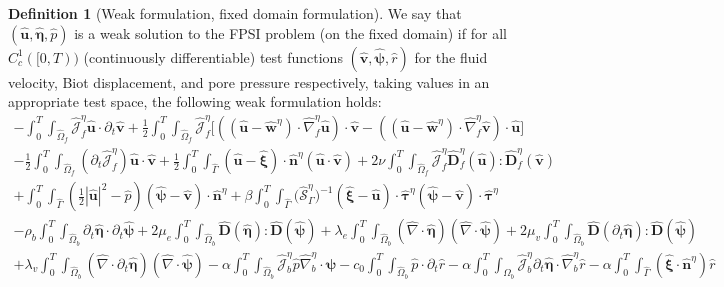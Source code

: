 \documentclass[11pt]{article}
\newcommand{\bd}{\boldsymbol}
\theoremstyle{definition}
\newtheorem{definition}{Definition}[section]
\begin{document}
\begin{definition}[Weak formulation, fixed domain formulation]\label{woregularitydef}
We say that $(\hat{\bd{u}}, \hat{\bd{\eta}}, \hat{p})$ is a weak solution to the FPSI problem (on the fixed domain) if for all $C_{c}^{1}([0, T))$ (continuously differentiable) test functions $(\hat{\bd{v}}, \hat{\bd{\psi}}, \hat{r})$ for the fluid velocity, Biot displacement, and pore pressure respectively, taking values in an appropriate test space, the following weak formulation holds:
\begin{multline*}
-\int_{0}^{T} \int_{\hat{\Omega}_{f}} \hat{\mathcal{J}}^{\eta}_{f} \hat{\bd{u}} \cdot \partial_{t} \hat{\bd{v}} + \frac{1}{2} \int_{0}^{T} \int_{\hat{\Omega}_{f}} \hat{\mathcal{J}}^{\eta}_{f} \Big[((\hat{\bd{u}} - \hat{\bd{w}}^{\eta}) \cdot \hat{\nabla}^{\eta}_{f} \hat{\bd{u}}) \cdot \hat{\bd{v}} - ((\hat{\bd{u}} - \hat{\bd{w}}^{\eta}) \cdot \hat{\nabla}^{\eta}_{f} \hat{\bd{v}}) \cdot \hat{\bd{u}}\Big] \\
- \frac{1}{2} \int_{0}^{T} \int_{\hat{\Omega}_{f}} (\partial_{t}\hat{\mathcal{J}}^{\eta}_{f}) \hat{\bd{u}} \cdot \hat{\bd{v}} + \frac{1}{2} \int_{0}^{T} \int_{\hat{\Gamma}} (\hat{\bd{u}} - \hat{\bd{\xi}}) \cdot \hat{\bd{n}}^{\eta} (\hat{\bd{u}} \cdot \hat{\bd{v}}) + 2\nu \int_{0}^{T} \int_{\hat{\Omega}_{f}} \hat{\mathcal{J}}^{\eta}_{f} \hat{\bd{D}}^{\eta}_{f}(\hat{\bd{u}}) : \hat{\bd{D}}^{\eta}_{f}(\hat{\bd{v}}) \\
+ \int_{0}^{T} \int_{\hat{\Gamma}} \left(\frac{1}{2} |\hat{\bd{u}}|^{2} - \hat{p}\right) (\hat{\bd{\psi}} - \hat{\bd{v}}) \cdot \hat{\bd{n}}^{\eta} + \beta \int_{0}^{T} \int_{\hat{\Gamma}} \Big(\hat{\mathcal{S}}^{\eta}_{\Gamma}\Big)^{-1} (\hat{\bd{\xi}} - \hat{\bd{u}}) \cdot \hat{\bd{\tau}}^{\eta} (\hat{\bd{\psi}} - \hat{\bd{v}}) \cdot \hat{\bd{\tau}}^{\eta} \\
- \rho_{b} \int_{0}^{T} \int_{\hat{\Omega}_{b}} \partial_{t} \hat{\bd{\eta}} \cdot \partial_{t} \hat{\bd{\psi}} + 2\mu_{e} \int_{0}^{T} \int_{\hat{\Omega}_{b}} \hat{\bd{D}}(\hat{\bd{\eta}}) : \hat{\bd{D}}(\hat{\bd{\psi}}) + \lambda_{e} \int_{0}^{T} \int_{\hat{\Omega}_{b}} (\hat{\nabla} \cdot \hat{\bd{\eta}}) (\hat{\nabla} \cdot \hat{\bd{\psi}}) + 2\mu_{v} \int_{0}^{T} \int_{\hat{\Omega}_{b}} \hat{\bd{D}}(\partial_{t}\hat{\bd{\eta}}) : \hat{\bd{D}}(\hat{\bd{\psi}}) \\
+ \lambda_{v} \int_{0}^{T} \int_{\hat{\Omega}_{b}} (\hat{\nabla} \cdot \partial_{t} \hat{\bd{\eta}}) (\hat{\nabla} \cdot \hat{\bd{\psi}}) - \alpha \int_{0}^{T} \int_{\hat{\Omega}_{b}} \hat{\mathcal{J}}^{\eta}_{b} \hat{p} \hat{\nabla}^{\eta}_{b} \cdot \bd{\psi} - c_{0} \int_{0}^{T} \int_{\hat{\Omega}_{b}} \hat{p} \cdot \partial_{t} \hat{r} - \alpha \int_{0}^{T} \int_{\hat{\Omega}_{b}} \hat{\mathcal{J}}^{\eta}_{b} \partial_{t} \hat{\bd{\eta}} \cdot \hat{\nabla}^{\eta}_{b} \hat{r} - \alpha \int_{0}^{T} \int_{\hat{\Gamma}} (\hat{\bd{\xi}} \cdot \hat{\bd{n}}^{\eta}) \hat{r} \\

\end{multline*}
\end{definition}
\end{document}
